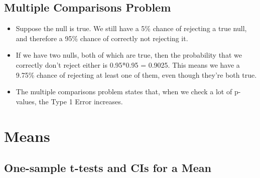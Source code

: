 \documentclass[
  letterpaper,
  DIV=11,
  numbers=noendperiod,
  oneside]{scrreprt}
\providecommand{\tightlist}{%
  \setlength{\itemsep}{0pt}\setlength{\parskip}{0pt}}\usepackage{longtable,booktabs,array}
\begin{document}
\hypertarget{multiple-comparisons-problem}{%
\subsection{Multiple Comparisons
Problem}\label{multiple-comparisons-problem}}

\begin{itemize}
\tightlist
\item
  Suppose the null is true. We still have a 5\% chance of rejecting a
  true null, and therefore a 95\% chance of correctly not rejecting it.
\item
  If we have two nulls, both of which are true, then the probability
  that we correctly don't reject either is 0.95*0.95 = 0.9025. This
  means we have a 9.75\% chance of rejecting at least one of them, even
  though they're both true.
\item
  The multiple comparisons problem states that, when we check a lot of
  p-values, the Type 1 Error increases.
\end{itemize}

\hypertarget{means}{%
\section{Means}\label{means}}

\hypertarget{one-sample-t-tests-and-cis-for-a-mean}{%
\subsection{One-sample t-tests and CIs for a
Mean}\label{one-sample-t-tests-and-cis-for-a-mean}}
\end{document}
